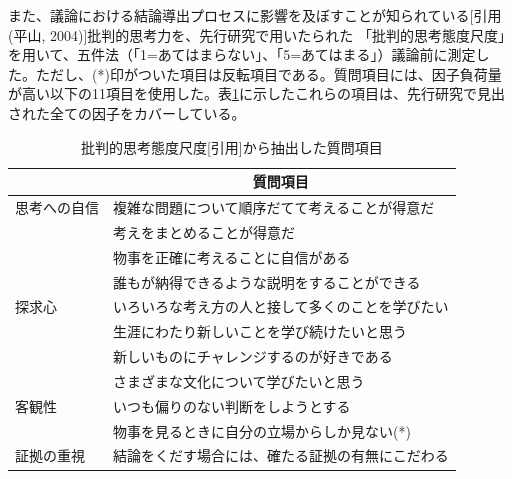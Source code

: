 \documentclass[11pt, a4paper]{jreport} %
\begin{document}
また、議論における結論導出プロセスに影響を及ぼすことが知られている[引用(平山, 2004)]批判的思考力を、先行研究で用いたられた
「批判的思考態度尺度」を用いて、五件法（「1=あてはまらない」、「5=あてはまる」）議論前に測定した。ただし、(*)印がついた項目は反転項目である。質問項目には、因子負荷量が高い以下の11項目を使用した。表\ref{tab:hihanteki3}に示したこれらの項目は、先行研究で見出された全ての因子をカバーしている。
\begin{table}[H]
\caption{批判的思考態度尺度{[}引用{]}から抽出した質問項目}
\centering
\label{tab:hihanteki3}
\begin{tabular}{@{}ll@{}}
\toprule
\multicolumn{1}{c}{} & \multicolumn{1}{c}{質問項目} \\ \midrule
思考への自信               & 複雑な問題について順序だてて考えることが得意だ  \\
                     & 考えをまとめることが得意だ            \\
                     & 物事を正確に考えることに自信がある        \\
                     & 誰もが納得できるような説明をすることができる   \\
探求心                  & いろいろな考え方の人と接して多くのことを学びたい \\
                     & 生涯にわたり新しいことを学び続けたいと思う    \\
                     & 新しいものにチャレンジするのが好きである     \\
                     & さまざまな文化について学びたいと思う       \\
客観性                  & いつも偏りのない判断をしようとする        \\
                     & 物事を見るときに自分の立場からしか見ない(*)     \\
証拠の重視                & 結論をくだす場合には、確たる証拠の有無にこだわる \\ \bottomrule
\end{tabular}
\end{table}
\end{document}
